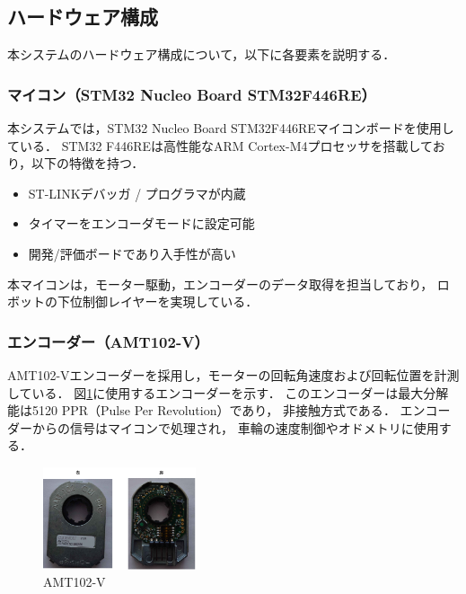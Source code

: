 
\subsection{ハードウェア構成}
本システムのハードウェア構成について，以下に各要素を説明する．

\subsubsection{マイコン（STM32 Nucleo Board STM32F446RE）}
本システムでは，STM32 Nucleo Board STM32F446REマイコンボードを使用している．
STM32 F446REは高性能なARM Cortex-M4プロセッサを搭載しており，以下の特徴を持つ\cite{stm}．
\begin{itemize}
  \item ST-LINKデバッガ / プログラマが内蔵
  \item タイマーをエンコーダモードに設定可能
  \item 開発/評価ボードであり入手性が高い
\end{itemize}
本マイコンは，モーター駆動，エンコーダーのデータ取得を担当しており，
ロボットの下位制御レイヤーを実現している．


\subsubsection{エンコーダー（AMT102-V）}
AMT102-Vエンコーダーを採用し，モーターの回転角速度および回転位置を計測している．
図\ref{fig:AMT102}に使用するエンコーダーを示す．
このエンコーダーは最大分解能は5120 PPR（Pulse Per Revolution）であり，
非接触方式である\cite{amt}．
エンコーダーからの信号はマイコンで処理され，
車輪の速度制御やオドメトリに使用する．

\begin{figure}[H]
  \centering
  \includegraphics[width=0.4\textwidth]{figure/AMT102.pdf}
  \caption{AMT102-V}
  \label{fig:AMT102}
\end{figure}

